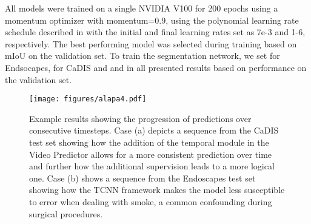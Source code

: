 \documentclass[twoside, print]{ieeecolor_arxiv}
\begin{document}
All models were trained on a single NVIDIA V100 for 200 epochs using a momentum optimizer with momentum=0.9, using the polynomial learning rate schedule described in \cite{hq1} with the initial and final learning rates set as 7e-3 and 1-6, respectively. The best performing model was selected during training based on mIoU on the validation set. To train the segmentation network, we set  for Endsocapes,  for CaDIS and   and in all presented results based on performance on the validation set.


\begin{figure*}[]
\centerline{\texttt{[image: figures/alapa4.pdf]}}
\caption{Example results showing the progression of predictions over consecutive timesteps. Case (a) depicts a sequence from the CaDIS test set showing how the addition of the temporal module in the Video Predictor allows for a more consistent prediction over time and further how the additional supervision leads to a more logical one. Case (b) shows a sequence from the Endoscapes test set showing how the TCNN framework makes the model less susceptible to error when dealing with smoke, a common confounding during surgical procedures. }
\label{fig4}
\end{figure*}
\end{document}
